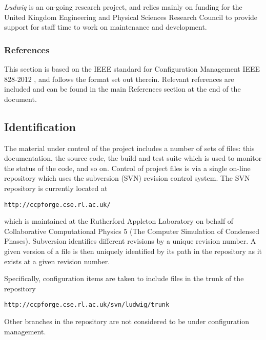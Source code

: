 \textit{Ludwig} is an on-going research project, and relies mainly
on funding for the United Kingdom Engineering and Physical Sciences Research
Council to provide support for staff time to work on maintenance and
development.


\subsubsection{References}

This section is based on the IEEE standard for Configuration
Management IEEE 828-2012 \cite{ieee-828-2012}, and follows the format
set out therein.
Relevant references are included and can be found in the main References
section at the end of the document.
%



\subsection{Identification}

The material under control of the project includes a number of sets
of files: this documentation, the source code, the build and test
suite which is used to monitor the status of the code, and so on.
Control of project files is via a single on-line repository which
uses the subversion (SVN) revision control system. The SVN repository
is currently located at

\texttt{http://ccpforge.cse.rl.ac.uk/}

which is maintained at the Rutherford Appleton Laboratory on behalf
of Collaborative Computational Physics 5 (The Computer Simulation of
Condensed Phases). Subversion identifies different revisions by a
unique revision number. A given version of a file is then uniquely
identified by its path in the repository as it exists at a given
revision number.

Specifically, configuration items are taken to include files in the
trunk of the repository

\texttt{http://ccpforge.cse.rl.ac.uk/svn/ludwig/trunk}

Other branches in the repository are not considered to be 
under configuration management.


